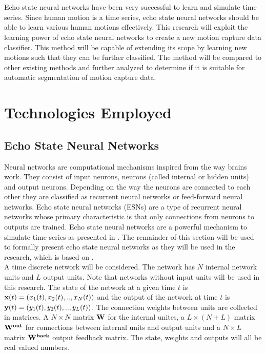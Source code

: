 \documentclass[10pt]{article}
\begin{document}
\\\\
Echo state neural networks have been very successful to learn and simulate time series\cite{JaegerESNTutorial}. Since human motion is a time series, echo state neural networks should be able to learn various human motions effectively. This research will exploit the learning power of echo state neural networks to create a new motion capture data classifier. This method will be capable of extending its scope by learning new motions such that they can be further classified. The method will be compared to other existing methods and further analyzed to determine if it is suitable for automatic segmentation of motion capture data.
\pagebreak
\section{Technologies Employed}

\subsection{Echo State Neural Networks}

Neural networks are computational mechanisms inspired from the way brains work. They consist of input neurons, neurons (called internal or hidden units) and output neurons. Depending on the way the neurons are connected to each other they are classified as recurrent neural networks or feed-forward neural networks. Echo state neural networks (ESNs) are a type of recurrent neural networks whose primary characteristic is that only connections from neurons to outputs are trained. Echo state neural networks are a powerful mechanism to simulate time series as presented in \cite{JaegerESNTutorial}. The remainder of this section will be used to formally present echo state neural networks as they will be used in the research, which is based on \cite{JaegerESNTutorial}.\\

A time discrete network will be considered. The network has $N$ internal network units and $L$ output units. Note that networks without input units will be used in this research. The state of the network at a given time $t$ is ${\bf x}(t)=(x_1(t),x_2(t),..,x_N(t))$ and the output of the network at time $t$ is ${\bf y}(t)=(y_1(t),y_2(t),..,y_L(t))$. The connection weights between units are collected in matrices. A  $N \times N$ matrix ${\bf W}$ for the internal unites, a $L \times (N+L)$ matrix ${\bf W^{out}}$ for connections between internal units and output units and a $N \times L$ matrix ${\bf W^{back}}$ output feedback matrix. The state, weights and outputs will all be real valued numbers.\\
\end{document}
